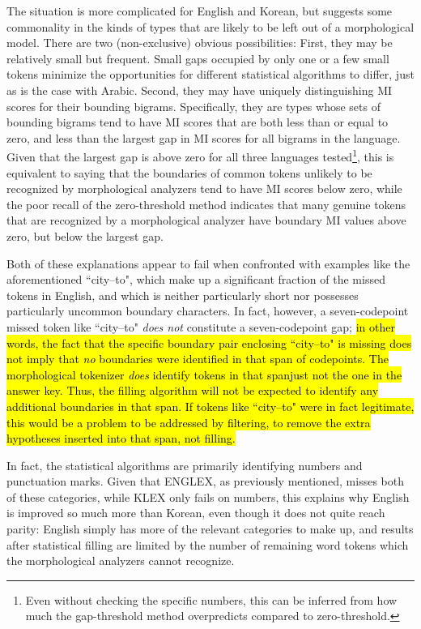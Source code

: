 The situation is more complicated for English and Korean, but suggests some commonality in the kinds of types that are likely to be left out of a morphological model. There are two (non-exclusive) obvious possibilities: First, they may be relatively small but frequent. Small gaps occupied by only one or a few small tokens minimize the opportunities for different statistical algorithms to differ, just as is the case with Arabic. Second, they may have uniquely distinguishing MI scores for their bounding bigrams. Specifically, they are types whose sets of bounding bigrams tend to have MI scores that are both less than or equal to zero, and less than the largest gap in MI scores for all bigrams in the language. Given that the largest gap is above zero for all three languages tested\footnote{Even without checking the specific numbers, this can be inferred from how much the gap-threshold method overpredicts compared to zero-threshold.}, this is equivalent to saying that the boundaries of common tokens unlikely to be recognized by morphological analyzers tend to have MI scores below zero, while the poor recall of the zero-threshold method indicates that many genuine tokens that are recognized by a morphological analyzer have boundary MI values above zero, but below the largest gap.

Both of these explanations appear to fail when confronted with examples like the aforementioned ``city--to", which make up a significant fraction of the missed tokens in English, and which is neither particularly short nor possesses particularly uncommon boundary characters. In fact, however, a seven-codepoint missed token like ``city--to" \textit{does not} constitute a seven-codepoint gap; \hl{in other words, the fact that the specific boundary pair enclosing ``city--to" is missing does not imply that \textit{no} boundaries were identified in that span of codepoints. The morphological tokenizer \textit{does} identify tokens in that span\textemdash just not the one in the answer key. Thus, the filling algorithm will not be expected to identify any additional boundaries in that span. If tokens like ``city--to" were in fact legitimate, this would be a problem to be addressed by filtering, to remove the extra hypotheses inserted into that span, not filling.}

In fact, the statistical algorithms are primarily identifying numbers and punctuation marks. Given that ENGLEX, as previously mentioned, misses both of these categories, while KLEX only fails on numbers, this explains why English is improved so much more than Korean, even though it does not quite reach parity: English simply has more of the relevant categories to make up, and results after statistical filling are limited by the number of remaining word tokens which the morphological analyzers cannot recognize.

